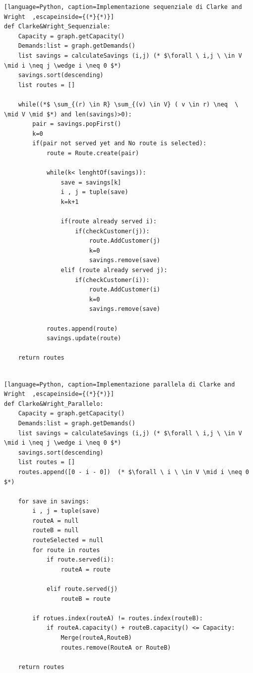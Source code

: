 \documentclass[]{article}
\begin{document}
\begin{lstlisting}[language=Python, caption=Implementazione sequenziale di Clarke and Wright  ,escapeinside={(*}{*)}]
def Clarke&Wright_Sequenziale:
	Capacity = graph.getCapacity()
	Demands:list = graph.getDemands()
	list savings = calculateSavings (i,j) (* $\forall \ i,j \ \in V \mid i \neq j \wedge i \neq 0 $*) 
	savings.sort(descending)
	list routes = []
	
	while((*$ \sum_{(r) \in R} \sum_{(v) \in V} ( v \in r) \neq  \ \mid V \mid $*) and len(savings)>0):
		pair = savings.popFirst()
		k=0
		if(pair not served yet and No route is selected):
			route = Route.create(pair)
			
			while(k< lenghtOf(savings)):
				save = savings[k]
				i , j = tuple(save)
				k=k+1
				
				if(route already served i):
					if(checkCustomer(j)):
						route.AddCustomer(j)
						k=0
						savings.remove(save)							
				elif (route already served j):
					if(checkCustomer(i)):
						route.AddCustomer(i)
						k=0
						savings.remove(save)				
					
			routes.append(route)
			savings.update(route)
					
	return routes	
				
\end{lstlisting}


\begin{lstlisting}[language=Python, caption=Implementazione parallela di Clarke and Wright  ,escapeinside={(*}{*)}]
def Clarke&Wright_Parallelo:
	Capacity = graph.getCapacity()
	Demands:list = graph.getDemands()
	list savings = calculateSavings (i,j) (* $\forall \ i,j \ \in V \mid i \neq j \wedge i \neq 0 $*) 
	savings.sort(descending)
	list routes = []
	routes.append([0 - i - 0])  (* $\forall \ i \ \in V \mid i \neq 0 $*) 
	
	for save in savings:
		i , j = tuple(save)
		routeA = null
		routeB = null
		routeSelected = null
		for route in routes
			if route.served(i):
				routeA = route

			elif route.served(j)
				routeB = route
					    
		if rotues.index(routeA) != routes.index(routeB):
			if routeA.capacity() + routeB.capacity() <= Capacity:
				Merge(routeA,RouteB) 
				routes.remove(RouteA or RouteB)
				
	return routes
\end{lstlisting}
\end{document}
